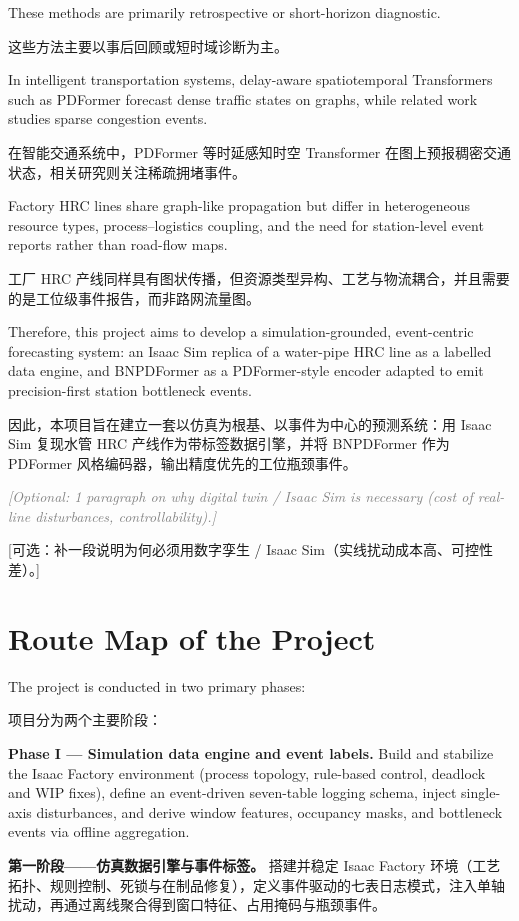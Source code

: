 \documentclass[12pt,a4paper,oneside,scheme=plain]{ctexrep}
\newcommand{\fillin}[2]{%
  \par\textit{\textcolor{gray}{[#1]}}\par
  {\small\color{gray}[#2]}\par
  \vspace{0.45em}%
}
\newcommand{\bip}[2]{%
  \par #1\par
  \nobreak\vspace{0.12em}%
  {\small\color{black!62}#2}\par
  \vspace{0.62em}%
}
\begin{document}
\bip
{These methods are primarily retrospective or short-horizon diagnostic.}
{这些方法主要以事后回顾或短时域诊断为主。}

\bip
{In intelligent transportation systems, delay-aware spatiotemporal Transformers such as PDFormer forecast dense traffic states on graphs, while related work studies sparse congestion events.}
{在智能交通系统中，PDFormer 等时延感知时空 Transformer 在图上预报稠密交通状态，相关研究则关注稀疏拥堵事件。}

\bip
{Factory HRC lines share graph-like propagation but differ in heterogeneous resource types, process--logistics coupling, and the need for station-level event reports rather than road-flow maps.}
{工厂 HRC 产线同样具有图状传播，但资源类型异构、工艺与物流耦合，并且需要的是工位级事件报告，而非路网流量图。}

\bip
{Therefore, this project aims to develop a simulation-grounded, event-centric forecasting system: an Isaac Sim replica of a water-pipe HRC line as a labelled data engine, and BNPDFormer as a PDFormer-style encoder adapted to emit precision-first station bottleneck events.}
{因此，本项目旨在建立一套以仿真为根基、以事件为中心的预测系统：用 Isaac Sim 复现水管 HRC 产线作为带标签数据引擎，并将 BNPDFormer 作为 PDFormer 风格编码器，输出精度优先的工位瓶颈事件。}

\fillin
{Optional: 1 paragraph on why digital twin / Isaac Sim is necessary (cost of real-line disturbances, controllability).}
{可选：补一段说明为何必须用数字孪生 / Isaac Sim（实线扰动成本高、可控性差）。}

\section[Route Map of the Project / 项目路线]{Route Map of the Project}
\label{sec:roadmap}

\bip
{The project is conducted in two primary phases:}
{项目分为两个主要阶段：}

\bip
{\textbf{Phase I --- Simulation data engine and event labels.}
Build and stabilize the Isaac Factory environment (process topology, rule-based control, deadlock and WIP fixes), define an event-driven seven-table logging schema, inject single-axis disturbances, and derive window features, occupancy masks, and bottleneck events via offline aggregation.}
{\textbf{第一阶段——仿真数据引擎与事件标签。}
搭建并稳定 Isaac Factory 环境（工艺拓扑、规则控制、死锁与在制品修复），定义事件驱动的七表日志模式，注入单轴扰动，再通过离线聚合得到窗口特征、占用掩码与瓶颈事件。}
\end{document}
